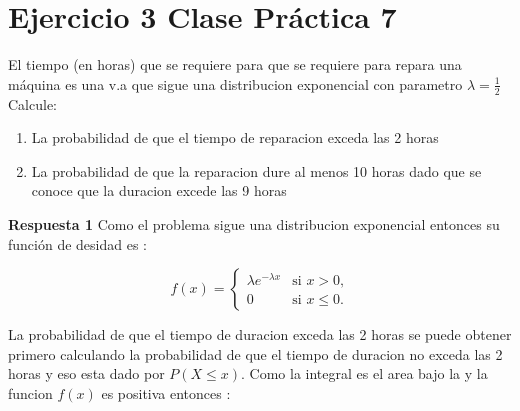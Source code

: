 \documentclass{article}
\begin{document}
            




    \section*{Ejercicio 3 Clase Pr\'actica 7}

    \begin{flushleft}

        El tiempo (en horas) que se requiere para que se requiere para repara una m\'aquina es una v.a 
        que sigue una distribucion exponencial con parametro $ \lambda = \frac{1}{2} $ Calcule: 
        \begin{enumerate}
            \item La probabilidad de que el tiempo de reparacion exceda las 2 horas 
            \item La probabilidad de que la reparacion dure al menos 10 horas dado que se conoce que
            la duracion excede las 9 horas 
        \end{enumerate} 
        
        {\bf Respuesta 1 } 
        Como el problema sigue una distribucion exponencial entonces su funci\'on de desidad es : 

        
        \begin{equation*}
            f(x)=\begin{cases}
                \lambda e^{-\lambda x }  & \mbox{si $x>0$,}
                \\
                0                        & \mbox{si $x\le 0$.}
                \end{cases}
        \end{equation*}

        La probabilidad de que el tiempo de duracion exceda las 2 horas se 
        puede obtener primero calculando la probabilidad de que el tiempo de 
        duracion no exceda las 2 horas  y eso esta dado por $P \left(X \le x\right)$. 
        Como la integral es el area bajo la y la funcion $f\left(x\right) $ es positiva 
        entonces : 
        



\end{flushleft}
\end{document}
